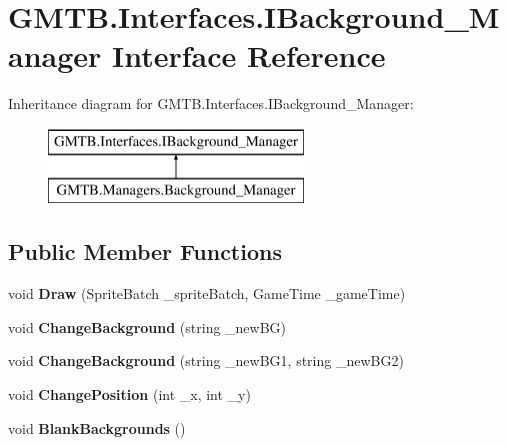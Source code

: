 \hypertarget{interface_g_m_t_b_1_1_interfaces_1_1_i_background___manager}{}\section{G\+M\+T\+B.\+Interfaces.\+I\+Background\+\_\+\+Manager Interface Reference}
\label{interface_g_m_t_b_1_1_interfaces_1_1_i_background___manager}
Inheritance diagram for G\+M\+T\+B.\+Interfaces.\+I\+Background\+\_\+\+Manager\+:\begin{figure}[H]
\begin{center}
\leavevmode
\includegraphics[height=2.000000cm]{interface_g_m_t_b_1_1_interfaces_1_1_i_background___manager}
\end{center}
\end{figure}
\subsection*{Public Member Functions}
\begin{DoxyCompactItemize}
\item 
\mbox{\label{interface_g_m_t_b_1_1_interfaces_1_1_i_background___manager_aa76b2344c5188c8bc5f18a1d10df70f2}} 
void {\bfseries Draw} (Sprite\+Batch \+\_\+sprite\+Batch, Game\+Time \+\_\+game\+Time)
\item 
\mbox{\label{interface_g_m_t_b_1_1_interfaces_1_1_i_background___manager_a04ac6524ae2570f9f814d413760f906a}} 
void {\bfseries Change\+Background} (string \+\_\+new\+BG)
\item 
\mbox{\label{interface_g_m_t_b_1_1_interfaces_1_1_i_background___manager_a15057ee883d1bc8905a159dc5abdb6ba}} 
void {\bfseries Change\+Background} (string \+\_\+new\+B\+G1, string \+\_\+new\+B\+G2)
\item 
\mbox{\label{interface_g_m_t_b_1_1_interfaces_1_1_i_background___manager_a37d61270caf2baa7d16ba9d2ad3ebc8d}} 
void {\bfseries Change\+Position} (int \+\_\+x, int \+\_\+y)
\item 
\mbox{\label{interface_g_m_t_b_1_1_interfaces_1_1_i_background___manager_a55f092e772f82fc691a4c3aa40a4530e}} 
void {\bfseries Blank\+Backgrounds} ()
\end{DoxyCompactItemize}
